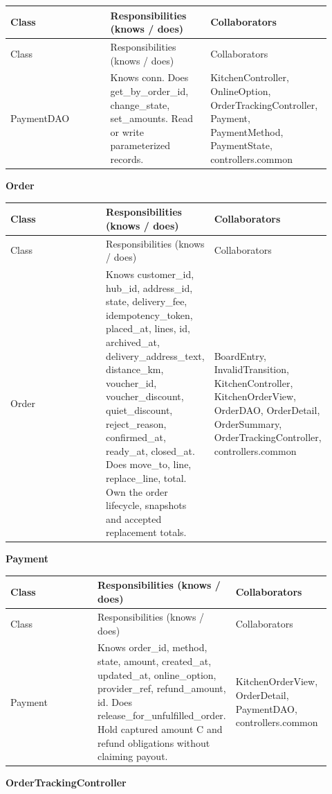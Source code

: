 \begin{longtable}{>{\raggedright\arraybackslash}p{0.3067\linewidth}>{\raggedright\arraybackslash}p{0.3067\linewidth}>{\raggedright\arraybackslash}p{0.3067\linewidth}}
Class & Responsibilities (knows / does) & Collaborators \\
\hline\endfirsthead
Class & Responsibilities (knows / does) & Collaborators \\
\hline\endhead
PaymentDAO & Knows conn. Does get\_by\_order\_id, change\_state, set\_amounts. Read or write parameterized records. & KitchenController, OnlineOption, OrderTrackingController, Payment, PaymentMethod, PaymentState, controllers.common \\
\end{longtable}
\textbf{Order}

\begin{longtable}{>{\raggedright\arraybackslash}p{0.3067\linewidth}>{\raggedright\arraybackslash}p{0.3067\linewidth}>{\raggedright\arraybackslash}p{0.3067\linewidth}}
Class & Responsibilities (knows / does) & Collaborators \\
\hline\endfirsthead
Class & Responsibilities (knows / does) & Collaborators \\
\hline\endhead
Order & Knows customer\_id, hub\_id, address\_id, state, delivery\_fee, idempotency\_token, placed\_at, lines, id, archived\_at, delivery\_address\_text, distance\_km, voucher\_id, voucher\_discount, quiet\_discount, reject\_reason, confirmed\_at, ready\_at, closed\_at. Does move\_to, line, replace\_line, total. Own the order lifecycle, snapshots and accepted replacement totals. & BoardEntry, InvalidTransition, KitchenController, KitchenOrderView, OrderDAO, OrderDetail, OrderSummary, OrderTrackingController, controllers.common \\
\end{longtable}
\textbf{Payment}

\begin{longtable}{>{\raggedright\arraybackslash}p{0.3067\linewidth}>{\raggedright\arraybackslash}p{0.3067\linewidth}>{\raggedright\arraybackslash}p{0.3067\linewidth}}
Class & Responsibilities (knows / does) & Collaborators \\
\hline\endfirsthead
Class & Responsibilities (knows / does) & Collaborators \\
\hline\endhead
Payment & Knows order\_id, method, state, amount, created\_at, updated\_at, online\_option, provider\_ref, refund\_amount, id. Does release\_for\_unfulfilled\_order. Hold captured amount C and refund obligations without claiming payout. & KitchenOrderView, OrderDetail, PaymentDAO, controllers.common \\
\end{longtable}
\textbf{OrderTrackingController}

